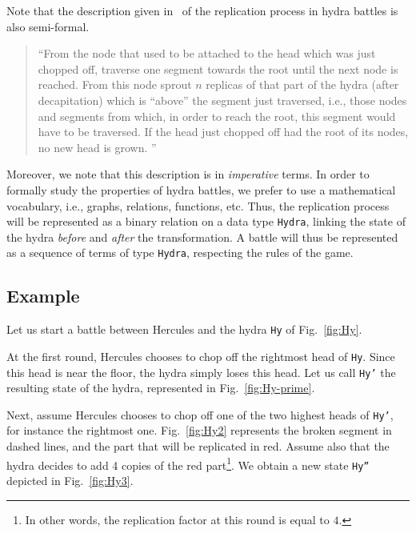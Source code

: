 Note that the description given in~\cite{KP82} of the replication process in hydra battles is also  semi-formal. 

\label{original-rules}

\begin{quote}
  ``From the node that used to be attached to the head which was just chopped off, traverse one 
segment towards the root until the next node is reached. From this node sprout $n$ replicas of 
that part of the hydra (after decapitation) which is ``above'' the segment just traversed, i.e., those 
nodes and segments from which, in order to reach the root, this segment would have to be 
traversed. If the head just chopped off had the root of its nodes, no new head is grown. ''
\end{quote}

Moreover, we note that this description is in \emph{imperative} terms. In order to formally study the properties of hydra battles, we prefer to use a mathematical vocabulary, i.e., graphs, relations, functions, etc.
Thus, the replication process will be represented as a binary relation on a data type \texttt{Hydra},
linking the state of the hydra \emph{before} and \emph{after} the transformation.
A battle will thus be represented as a sequence of terms of type \texttt{Hydra}, respecting the rules of the game.





\subsection{Example}
Let us start a battle between Hercules and the hydra \texttt{Hy} of Fig.~\ref{fig:Hy}.

At the first round, Hercules chooses to chop off the rightmost head of \texttt{Hy}.
Since this head is near the floor, the hydra simply loses this head. Let us call 
 \texttt{Hy'} the resulting state of the hydra, represented in Fig.~\vref{fig:Hy-prime}.

Next, assume Hercules chooses to chop off one of the two highest heads of \texttt{Hy'}, for instance the rightmost one. Fig.~\vref{fig:Hy2} represents the broken segment in dashed lines, and the part that will be replicated in red. Assume also that the hydra decides to add 4 copies of the red part\footnote{In other words, the replication factor at this round is equal to $4$.}. We obtain a new state \texttt{Hy''} depicted in Fig.~\ref{fig:Hy3}.



